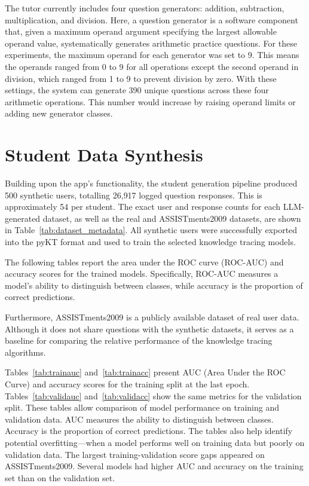 The tutor currently includes four question generators: addition, subtraction, multiplication, and division. Here, a question generator is a software component that, given a maximum operand argument specifying the largest allowable operand value, systematically generates arithmetic practice questions. For these experiments, the maximum operand for each generator was set to 9. This means the operands ranged from 0 to 9 for all operations except the second operand in division, which ranged from 1 to 9 to prevent division by zero. With these settings, the system can generate 390 unique questions across these four arithmetic operations. This number would increase by raising operand limits or adding new generator classes.

\section{Student Data Synthesis}

Building upon the app's functionality, the student generation pipeline produced 500 synthetic users, totalling 26{,}917 logged question responses. This is approximately 54 per student. The exact user and response counts for each LLM-generated dataset, as well as the real and ASSISTments2009 datasets, are shown in Table~\ref{tab:dataset_metadata}. All synthetic users were successfully exported into the pyKT format and used to train the selected knowledge tracing models.



The following tables report the area under the ROC curve (ROC-AUC) and accuracy scores for the trained models. Specifically, ROC-AUC measures a model's ability to distinguish between classes, while accuracy is the proportion of correct predictions.

Furthermore, ASSISTments2009 is a publicly available dataset of real user data. Although it does not share questions with the synthetic datasets, it serves as a baseline for comparing the relative performance of the knowledge tracing algorithms.

Tables~\ref{tab:trainauc} and~\ref{tab:trainacc} present AUC (Area Under the ROC Curve) and accuracy scores for the training split at the last epoch. Tables~\ref{tab:validauc} and~\ref{tab:validacc} show the same metrics for the validation split. These tables allow comparison of model performance on training and validation data. AUC measures the ability to distinguish between classes. Accuracy is the proportion of correct predictions. The tables also help identify potential overfitting—when a model performs well on training data but poorly on validation data. The largest training-validation score gaps appeared on ASSISTments2009. Several models had higher AUC and accuracy on the training set than on the validation set.

